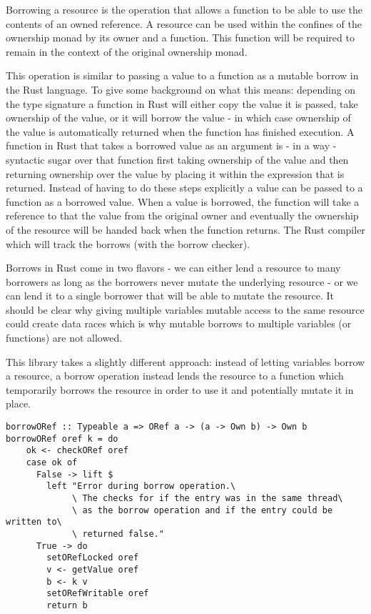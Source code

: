 \documentclass[onehalf,11pt]{beavtex}
\begin{document}
Borrowing a resource is the operation that allows a function to be able to use
the contents of an owned reference.
A resource can be used within the confines of the ownership monad by its owner
and a function. This function will be required to remain in the
context of the original ownership monad.

This operation is similar to passing a value to a function as a mutable
borrow in the Rust language.
To give some background on what this means:
depending on the type signature a function in Rust will either copy the value
it is passed, take ownership of the value, or it will borrow the value - in
which case ownership of the value is automatically returned when the function
has finished execution.\cite{rust_book_ownership}
A function in Rust that takes a borrowed value as an argument is - in a way -
syntactic sugar over that function first taking ownership of the value and then
returning ownership over the value by placing it within the expression that is
returned.
Instead of having to do these steps explicitly a value can be passed to a
function as a borrowed value.  When a value is borrowed, the function will take
a reference to that the value from the original owner and eventually the
ownership of the resource will be handed back when the function returns.
The Rust compiler which will track the borrows (with the borrow checker).

Borrows in Rust come in two flavors - we can either lend a resource to many
borrowers as long as the borrowers never mutate the underlying resource - or we
can lend it to a single borrower that will be able to mutate the
resource.\cite{rust_book_borrowing}
It should be clear why giving multiple variables mutable access to
the same resource could create data races which is why mutable borrows to
multiple variables (or functions) are not allowed.

This library takes a slightly different approach: instead of letting variables
borrow a resource, a borrow operation instead lends the resource to a function
which temporarily borrows the resource in order to use it and potentially mutate
it in place.

\begin{verbatim}
borrowORef :: Typeable a => ORef a -> (a -> Own b) -> Own b
borrowORef oref k = do
    ok <- checkORef oref
    case ok of
      False -> lift $
        left "Error during borrow operation.\
             \ The checks for if the entry was in the same thread\
             \ as the borrow operation and if the entry could be written to\
             \ returned false."
      True -> do
        setORefLocked oref
        v <- getValue oref
        b <- k v
        setORefWritable oref
        return b
\end{verbatim}
\end{document}
